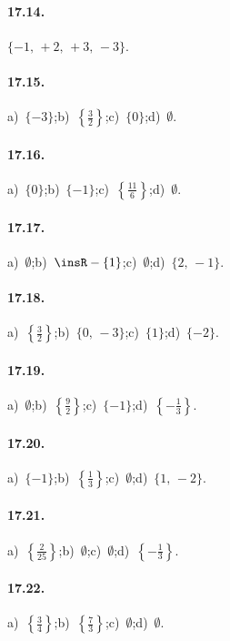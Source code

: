 \paragraph{17.14.}
$\{-1\text{,~}+2\text{,~}+3\text{,~}-3\}$.

\paragraph{17.15.}
a)~$\{-3\}$;\quad b)~$\left\{\frac{3}{2}\right\}$;\quad c)~$\{0\}$;\quad d)~$\emptyset$.

\paragraph{17.16.}
a)~$\{0\}$;\quad b)~$\{-1\}$;\quad c)~$\left\{\frac{11}{6}\right\}$;\quad d)~$\emptyset$.

\paragraph{17.17.}
a)~$\emptyset$;\quad b)~$\insR-\{1\}$;\quad c)~$\emptyset$;\quad d)~$\{2\text{,~}-1\}$.

\paragraph{17.18.}
a)~$\left\{\frac{3}{2}\right\}$;\quad b)~$\{0\text{,~}-3\}$;\quad c)~$\{1\}$;\quad d)~$\{-2\}$.

\paragraph{17.19.}
a)~$\emptyset$;\quad b)~$\left\{\frac{9}{2}\right\}$;\quad c)~$\{-1\}$;\quad d)~$\left\{-{\frac{1}{3}}\right\}$.

\paragraph{17.20.}
a)~$\{-1\}$;\quad b)~$\left\{\frac{1}{3}\right\}$;\quad c)~$\emptyset$;\quad d)~$\{1\text{,~}-2\}$.

\paragraph{17.21.}
a)~$\left\{\frac{2}{25}\right\}$;\quad b)~$\emptyset$;\quad c)~$\emptyset$;\quad d)~$\left\{-{\frac{1}{3}}\right\}$.

\paragraph{17.22.}
a)~$\left\{\frac{3}{4}\right\}$;\quad b)~$\left\{\frac{7}{3}\right\}$;\quad c)~$\emptyset$;\quad d)~$\emptyset$.

